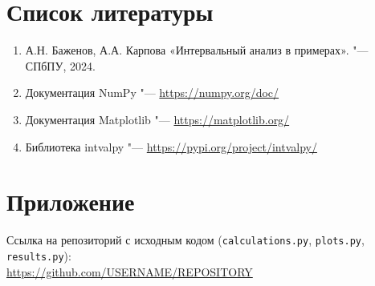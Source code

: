 \documentclass[12pt,a4paper]{article}
\begin{document}
\section{Список литературы}
\begin{enumerate}
\item А.Н. Баженов, А.А. Карпова «Интервальный анализ в примерах». "--- СПбПУ, 2024.
\item Документация NumPy "--- \url{https://numpy.org/doc/}
\item Документация Matplotlib "--- \url{https://matplotlib.org/}
\item Библиотека intvalpy "--- \url{https://pypi.org/project/intvalpy/}
\end{enumerate}

\section{Приложение}
Ссылка на репозиторий с исходным кодом (\texttt{calculations.py}, \texttt{plots.py}, \texttt{results.py}):\\
\url{https://github.com/USERNAME/REPOSITORY}
\end{document}
